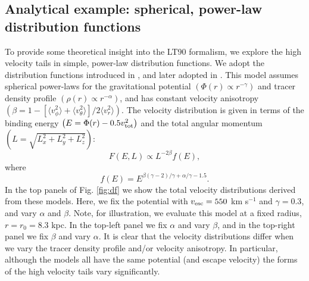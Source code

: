 \documentclass[fleqn,usenatbib]{mnras}
\begin{document}
\subsection{Analytical example: spherical, power-law distribution functions}
\label{sec:dfs}
To provide some theoretical insight into the LT90 formalism, we explore the high velocity tails in simple, power-law distribution functions. We adopt the distribution functions introduced in \cite{evans97}, and later adopted in \cite{deason11a}. This model assumes spherical power-laws for the gravitational potential $\left(\Phi(r) \propto r^{-\gamma}\right)$ and tracer density profile $\left(\rho(r) \propto r^{-\alpha}\right)$, and has constant velocity anisotropy $\left(\beta=1-\left[\langle v^2_\phi\rangle + \langle v^2_\theta\rangle\right]/2\langle v^2_r\rangle \right)$. The velocity distribution is given in terms of the binding energy $\left(E = \Phi(r)-0.5v^2_{\rm tot}\right)$ and the total angular momentum $\left(L=\sqrt{L^2_x+L^2_y+L^2_z}\right)$:
\begin{equation}
\label{eq:df1}
F(E,L) \propto L^{-2\beta} f(E),
\end{equation}
where
\begin{equation}
\label{eq:df2}
f(E) = E^{\beta(\gamma-2)/\gamma+\alpha/\gamma-1.5}.
\end{equation}
In the top panels of Fig. \ref{fig:df} we show the total velocity distributions derived from these models. Here, we fix the potential with $v_{\rm esc} = 550$ km s$^{-1}$ and $\gamma=0.3$, and vary $\alpha$ and $\beta$. Note, for illustration, we evaluate this model at a fixed radius, $r=r_0=8.3$ kpc. In the top-left panel we fix $\alpha$ and vary $\beta$, and in the top-right panel we fix $\beta$ and vary $\alpha$. It is clear that the velocity distributions differ when we vary the tracer density profile and/or velocity anisotropy. In particular, although the models all have the same potential (and escape velocity) the forms of the high velocity tails vary significantly.
\end{document}

